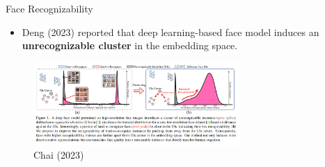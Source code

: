 \documentclass[aspectratio=169,xcolor=dvipsnames]{beamer}
\begin{document}

\begin{frame}{Face Recognizability}
    \begin{itemize}
        \item Deng (2023) reported that deep learning-based face model induces an \textbf{unrecognizable cluster} in the embedding space.
    \end{itemize}
    \begin{figure}
        \centering
        \includegraphics[width=0.7\textwidth]{imgs/01_Recognizability.png}
        \caption{Chai (2023)}
        \label{fig:recognizability}
    \end{figure}
\end{frame}
\end{document}
